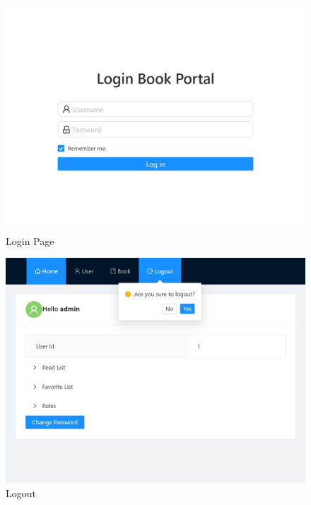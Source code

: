 \begin{minipage}{.49\textwidth}  
  \begin{figure}[H]
    \centering
  \includegraphics[width=\textwidth]{img/front-end/login-page.png}
  \caption{Login Page}
  \end{figure}
\end{minipage}
\begin{minipage}{.49\textwidth}
  \begin{figure}[H]
    \centering
  \includegraphics[width=\textwidth]{img/front-end/logout.png}
  \caption{Logout}
  \end{figure}
\end{minipage}


